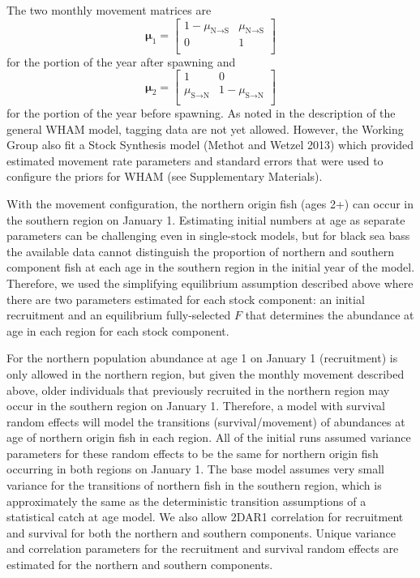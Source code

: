 \documentclass[
]{article}
\begin{document}
The two monthly movement matrices are \begin{equation*}
\boldsymbol{\mu}_{1} = 
  \begin{bmatrix}
     1-\mu_{\text{N}\rightarrow \text{S}} & \mu_{\text{N}\rightarrow \text{S}} \\
     0 & 1 \\
  \end{bmatrix}
\end{equation*} for the portion of the year after spawning and
\begin{equation*}
\boldsymbol{\mu}_{2} = 
  \begin{bmatrix}
     1 &  0 \\
     \mu_{\text{S}\rightarrow \text{N}} & 1-\mu_{\text{S}\rightarrow \text{N}} \\
  \end{bmatrix}
\end{equation*} for the portion of the year before spawning. As noted in
the description of the general WHAM model, tagging data are not yet
allowed. However, the Working Group also fit a Stock Synthesis model
(Methot and Wetzel 2013) which provided estimated movement rate
parameters and standard errors that were used to configure the priors
for WHAM (see Supplementary Materials).

With the movement configuration, the northern origin fish (ages 2+) can
occur in the southern region on January 1. Estimating initial numbers at
age as separate parameters can be challenging even in single-stock
models, but for black sea bass the available data cannot distinguish the
proportion of northern and southern component fish at each age in the
southern region in the initial year of the model. Therefore, we used the
simplifying equilibrium assumption described above where there are two
parameters estimated for each stock component: an initial recruitment
and an equilibrium fully-selected \(F\) that determines the abundance at
age in each region for each stock component.

For the northern population abundance at age 1 on January 1
(recruitment) is only allowed in the northern region, but given the
monthly movement described above, older individuals that previously
recruited in the northern region may occur in the southern region on
January 1. Therefore, a model with survival random effects will model
the transitions (survival/movement) of abundances at age of northern
origin fish in each region. All of the initial runs assumed variance
parameters for these random effects to be the same for northern origin
fish occurring in both regions on January 1. The base model assumes very
small variance for the transitions of northern fish in the southern
region, which is approximately the same as the deterministic transition
assumptions of a statistical catch at age model. We also allow 2DAR1
correlation for recruitment and survival for both the northern and
southern components. Unique variance and correlation parameters for the
recruitment and survival random effects are estimated for the northern
and southern components.
\end{document}

